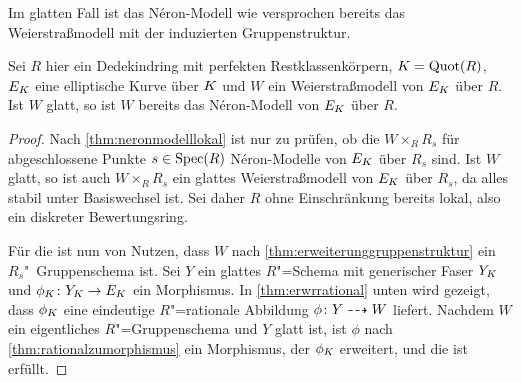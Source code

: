 Im glatten Fall ist das Néron-Modell wie versprochen bereits das
Weierstraßmodell mit der induzierten Gruppenstruktur.
\begin{Satz}\label{thm:neronmausweierstrassgl}
  Sei $R$ hier ein Dedekindring mit perfekten Restklassenkörpern,
  ${K=\operatorname{Quot}(R)}$,
  $E_{K}$ eine elliptische Kurve über $K$ und
  $W$ ein Weierstraßmodell von $E_{K}$ über $R$.
  Ist $W$ glatt, so ist $W$ bereits das Néron-Modell von $E_{K}$ über
  $R$.
  \begin{proof}
    Nach \ref{thm:neronmodelllokal} ist nur zu prüfen, ob die 
    $W\times_R R_s$ für abgeschlossene Punkte $s\in\operatorname{Spec}(R)$
    Néron-Modelle von $E_{K}$ über $R_s$ sind.
    Ist $W$ glatt, so ist auch $W\times_R R_s$ ein glattes
    Weierstraßmodell von $E_{K}$ über $R_s$, da alles stabil unter
    Basiswechsel ist.
    Sei daher $R$ ohne Einschränkung bereits lokal, also ein diskreter
    Bewertungsring.

    Für die \NAbbEig ist nun von Nutzen, dass $W$ nach
    \ref{thm:erweiterunggruppenstruktur} ein $R_s$"~Grup\-pen\-sche\-ma ist.
    Sei $Y$ ein glattes $R$"=Schema mit generischer Faser
    $Y_{K}$ und ${\phi_{K}\colon Y_{K}\to E_{K}}$ ein Morphismus.
    In \ref{thm:erwrrational} unten wird gezeigt, dass $\phi_{K}$ eine
    eindeutige $R$"=rationale Abbildung ${\phi\colon Y\dashrightarrow W}$ liefert.
    Nachdem $W$ ein eigentliches $R$"=Gruppenschema und $Y$ glatt ist,
    ist $\phi$ nach \ref{thm:rationalzumorphismus} ein Morphismus, der
    $\phi_{K}$ erweitert, und die \NAbbEig ist erfüllt.
  \end{proof}
\end{Satz}


